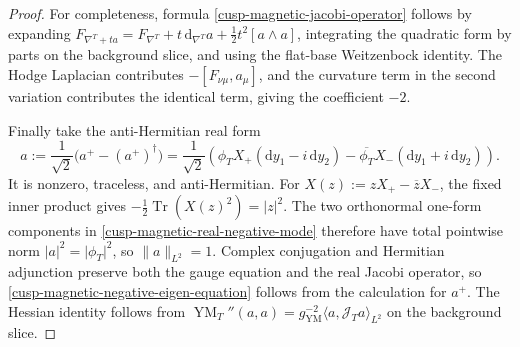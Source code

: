\begin{proof}
For completeness, formula \eqref{cusp-magnetic-jacobi-operator} follows by
expanding
\(F_{\nabla^T+ta}=F_{\nabla^T}+t\,\mathrm d_{\nabla^T}a+
\tfrac12t^2[a\wedge a]\), integrating the quadratic form by parts on
the background slice, and using the flat-base Weitzenbock identity.  The
Hodge Laplacian contributes
\(-[F_{\nu\mu},a_\mu]\), and the curvature term in the second variation
contributes the identical term, giving the coefficient \(-2\).

Finally take the anti-Hermitian real form
\begin{equation}
 a:=\frac1{\sqrt2}\bigl(a^+-(a^+)^\dagger\bigr)
  =\frac1{\sqrt2}\left(
   \phi_TX_+(\mathrm dy_1-i\,\mathrm dy_2)
   -\overline{\phi_T}X_-(\mathrm dy_1+i\,\mathrm dy_2)\right).
 \label{cusp-magnetic-real-negative-mode}
\end{equation}
It is nonzero, traceless, and anti-Hermitian.  For
\(X(z):=zX_+-\overline zX_-\), the fixed inner product gives
\(-\tfrac12\operatorname{Tr}(X(z)^2)=\lvert z\rvert^2\).  The two
orthonormal one-form components in
\cref{cusp-magnetic-real-negative-mode} therefore have total pointwise
norm \(\lvert a\rvert^2=\lvert\phi_T\rvert^2\), so
\(\lVert a\rVert_{L^2}=1\).  Complex conjugation and
Hermitian adjunction preserve both the gauge equation and the real Jacobi
operator, so \eqref{cusp-magnetic-negative-eigen-equation} follows from
the calculation for \(a^+\).  The Hessian identity follows from
\(\operatorname{YM}_T''(a,a)
=g_{\mathrm{YM}}^{-2}\langle a,\mathcal J_Ta\rangle_{L^2}\)
on the background slice.
\end{proof}
